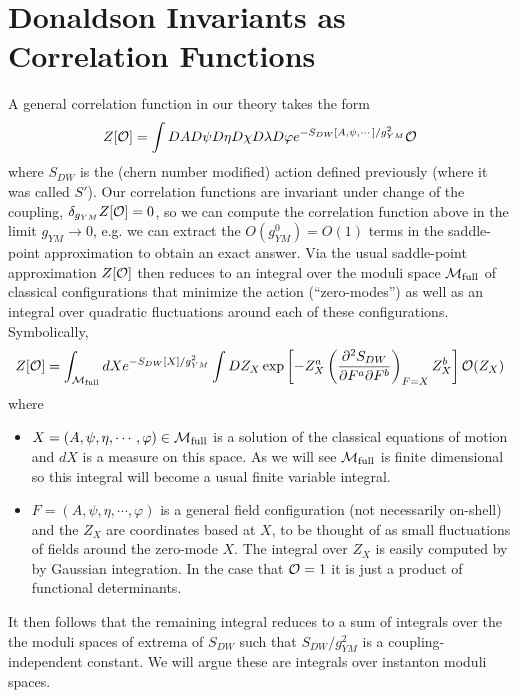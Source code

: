 \documentclass[12pt, onecolumn]{article}
\begin{document}
\section{Donaldson Invariants as Correlation Functions}
A general correlation function in our theory takes the form
\begin{align*}
Z[{\cal O}]=\int DA D\psi D\eta D\chi D\lambda D\varphi e^{-S_{DW}[A,\psi,\cdots]/g_{YM}^2} {\cal O}
\end{align*}
where $S_{DW}$ is the (chern number modified) action defined previously (where it was called $S'$).  Our correlation functions are invariant under change of the coupling, $\delta_{g_{YM}}Z[{\cal O}]=0$, so we can compute the correlation function above in the limit $g_{YM} \rightarrow 0$, e.g. we can extract the $O(g_{YM}^{0})=O(1)$ terms in the saddle-point approximation to obtain an exact answer.  Via the usual saddle-point approximation $Z[{\cal O}]$ then reduces to an integral over the moduli space ${\cal M}_{\text{full}}$ of classical configurations that minimize the action (``zero-modes'') as well as an integral over quadratic fluctuations around each of these configurations.  Symbolically,
\begin{align}
Z[{\cal O}]=\int_{{\cal M_{\text{full}}}}dX e^{-S_{DW}[X]/g_{YM}^2} \int DZ_{X} \exp\left[-Z_{X}^{a}\left(\frac{\partial^2 S_{DW}}{\partial F^{a} \partial F^{b}}\right)_{F=X}Z_{X}^{b}\right]{\cal O}(Z_{X})
\label{eqn_pathint}
\end{align}
where
\begin{itemize}
\item $X=(A,\psi,\eta,\cdots,\varphi) \in {\cal M_{\text{full}}}$ is a solution of the classical equations of motion and $dX$ is a measure on this space.  As we will see ${\cal M}_{\text{full}}$ is finite dimensional so this integral will become a usual finite variable integral.
\item $F=(A,\psi,\eta,\cdots,\varphi)$ is a general field configuration (not necessarily on-shell) and the $Z_{X}$ are coordinates based at $X$, to be thought of as small fluctuations of fields around the zero-mode $X$.  The integral over $Z_{X}$ is easily computed by by Gaussian integration.  In the case that ${\cal O}=1$ it is just a product of functional determinants.
\end{itemize}


\noindent It then follows that the remaining integral reduces to a sum of integrals over the the moduli spaces of extrema of $S_{DW}$ such that $S_{DW}/g_{YM}^2$ is a coupling-independent constant.  We will argue these are integrals over instanton moduli spaces.
\end{document}

